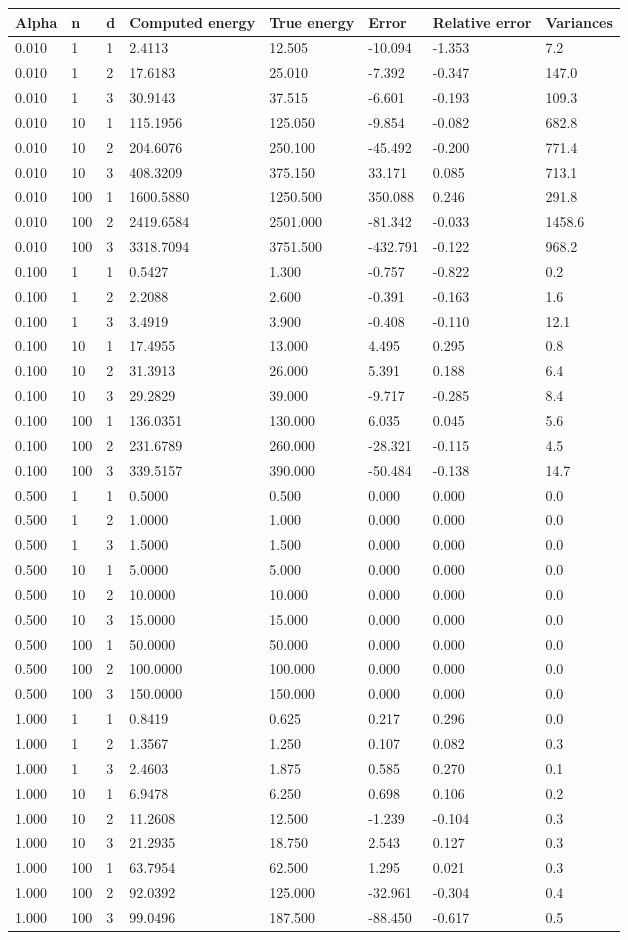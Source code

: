 \documentclass{article}
\begin{document}
\begin{longtable}[]{@{}llllllll@{}}
\toprule
Alpha & n & d & Computed energy & True energy & Error & Relative error &
Variances\tabularnewline
\midrule
\endhead
0.010 & 1 & 1 & 2.4113 & 12.505 & -10.094 & -1.353 & 7.2\tabularnewline
0.010 & 1 & 2 & 17.6183 & 25.010 & -7.392 & -0.347 &
147.0\tabularnewline
0.010 & 1 & 3 & 30.9143 & 37.515 & -6.601 & -0.193 &
109.3\tabularnewline
0.010 & 10 & 1 & 115.1956 & 125.050 & -9.854 & -0.082 &
682.8\tabularnewline
0.010 & 10 & 2 & 204.6076 & 250.100 & -45.492 & -0.200 &
771.4\tabularnewline
0.010 & 10 & 3 & 408.3209 & 375.150 & 33.171 & 0.085 &
713.1\tabularnewline
0.010 & 100 & 1 & 1600.5880 & 1250.500 & 350.088 & 0.246 &
291.8\tabularnewline
0.010 & 100 & 2 & 2419.6584 & 2501.000 & -81.342 & -0.033 &
1458.6\tabularnewline
0.010 & 100 & 3 & 3318.7094 & 3751.500 & -432.791 & -0.122 &
968.2\tabularnewline
0.100 & 1 & 1 & 0.5427 & 1.300 & -0.757 & -0.822 & 0.2\tabularnewline
0.100 & 1 & 2 & 2.2088 & 2.600 & -0.391 & -0.163 & 1.6\tabularnewline
0.100 & 1 & 3 & 3.4919 & 3.900 & -0.408 & -0.110 & 12.1\tabularnewline
0.100 & 10 & 1 & 17.4955 & 13.000 & 4.495 & 0.295 & 0.8\tabularnewline
0.100 & 10 & 2 & 31.3913 & 26.000 & 5.391 & 0.188 & 6.4\tabularnewline
0.100 & 10 & 3 & 29.2829 & 39.000 & -9.717 & -0.285 & 8.4\tabularnewline
0.100 & 100 & 1 & 136.0351 & 130.000 & 6.035 & 0.045 &
5.6\tabularnewline
0.100 & 100 & 2 & 231.6789 & 260.000 & -28.321 & -0.115 &
4.5\tabularnewline
0.100 & 100 & 3 & 339.5157 & 390.000 & -50.484 & -0.138 &
14.7\tabularnewline
0.500 & 1 & 1 & 0.5000 & 0.500 & 0.000 & 0.000 & 0.0\tabularnewline
0.500 & 1 & 2 & 1.0000 & 1.000 & 0.000 & 0.000 & 0.0\tabularnewline
0.500 & 1 & 3 & 1.5000 & 1.500 & 0.000 & 0.000 & 0.0\tabularnewline
0.500 & 10 & 1 & 5.0000 & 5.000 & 0.000 & 0.000 & 0.0\tabularnewline
0.500 & 10 & 2 & 10.0000 & 10.000 & 0.000 & 0.000 & 0.0\tabularnewline
0.500 & 10 & 3 & 15.0000 & 15.000 & 0.000 & 0.000 & 0.0\tabularnewline
0.500 & 100 & 1 & 50.0000 & 50.000 & 0.000 & 0.000 & 0.0\tabularnewline
0.500 & 100 & 2 & 100.0000 & 100.000 & 0.000 & 0.000 &
0.0\tabularnewline
0.500 & 100 & 3 & 150.0000 & 150.000 & 0.000 & 0.000 &
0.0\tabularnewline
1.000 & 1 & 1 & 0.8419 & 0.625 & 0.217 & 0.296 & 0.0\tabularnewline
1.000 & 1 & 2 & 1.3567 & 1.250 & 0.107 & 0.082 & 0.3\tabularnewline
1.000 & 1 & 3 & 2.4603 & 1.875 & 0.585 & 0.270 & 0.1\tabularnewline
1.000 & 10 & 1 & 6.9478 & 6.250 & 0.698 & 0.106 & 0.2\tabularnewline
1.000 & 10 & 2 & 11.2608 & 12.500 & -1.239 & -0.104 & 0.3\tabularnewline
1.000 & 10 & 3 & 21.2935 & 18.750 & 2.543 & 0.127 & 0.3\tabularnewline
1.000 & 100 & 1 & 63.7954 & 62.500 & 1.295 & 0.021 & 0.3\tabularnewline
1.000 & 100 & 2 & 92.0392 & 125.000 & -32.961 & -0.304 &
0.4\tabularnewline
1.000 & 100 & 3 & 99.0496 & 187.500 & -88.450 & -0.617 &
0.5\tabularnewline
\bottomrule
\end{longtable}
\end{document}
